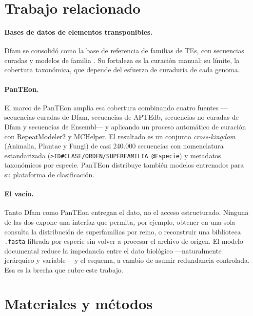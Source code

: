 \documentclass[journal]{IEEEtran}
\begin{document}
\section{Trabajo relacionado}
\paragraph*{Bases de datos de elementos transponibles.}
Dfam se consolidó como la base de referencia de familias de TEs, con secuencias curadas y
modelos de familia \cite{storer2021dfam}. Su fortaleza es la curación manual; su límite,
la cobertura taxonómica, que depende del esfuerzo de curaduría de cada genoma.

\paragraph*{PanTEon.}
El marco de PanTEon \cite{orozco2026panteon} amplía esa cobertura combinando cuatro
fuentes ---secuencias curadas de Dfam, secuencias de APTEdb, secuencias no curadas de Dfam
y secuencias de Ensembl--- y aplicando un proceso automático de curación con
RepeatModeler2 y MCHelper. El resultado es un conjunto \textit{cross-kingdom} (Animalia,
Plantae y Fungi) de casi 240.000 secuencias con nomenclatura estandarizada
(\texttt{>ID\#CLASE/ORDEN/SUPERFAMILIA @Especie}) y metadatos taxonómicos por especie.
PanTEon distribuye también modelos entrenados para su plataforma de clasificación.

\paragraph*{El vacío.}
Tanto Dfam como PanTEon entregan el dato, no el acceso estructurado. Ninguna de las dos
expone una interfaz que permita, por ejemplo, obtener en una sola consulta la distribución
de superfamilias por reino, o reconstruir una biblioteca \texttt{.fasta} filtrada por
especie sin volver a procesar el archivo de origen. El modelo documental reduce la
impedancia entre el dato biológico ---naturalmente jerárquico y variable--- y el esquema,
a cambio de asumir redundancia controlada. Esa es la brecha que cubre este trabajo.

\section{Materiales y métodos}
\end{document}
